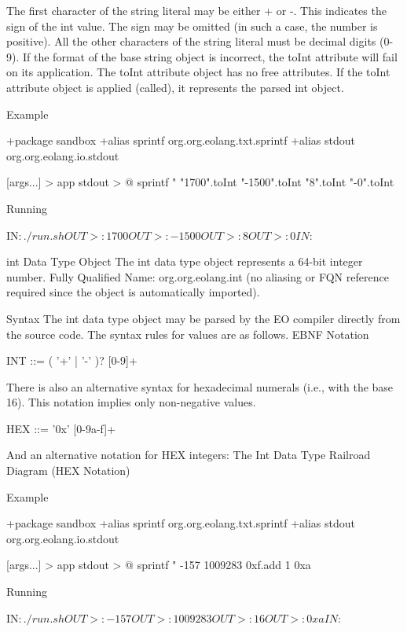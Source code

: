 \documentclass[12pt]{book}
\begin{document}
The first character of the string literal may be either + or -. This indicates the sign of the int value. The sign may be omitted (in such a case, the number is positive).
All the other characters of the string literal must be decimal digits (0-9).
If the format of the base string object is incorrect, the toInt attribute will fail on its application.
The toInt attribute object has no free attributes.
If the toInt attribute object is applied (called), it represents the parsed int object.

Example

\begin{ffcode}
+package sandbox
+alias sprintf org.org.eolang.txt.sprintf
+alias stdout org.org.eolang.io.stdout

[args...] > app
  stdout > @
    sprintf
      "%
      "1700".toInt
      "-1500".toInt
      "8".toInt
      "-0".toInt

Running

IN$: ./run.sh
OUT>: 1700
OUT>: -1500
OUT>: 8
OUT>: 0
IN$: 
\end{ffcode}
int Data Type Object
The int data type object represents a 64-bit integer number.
Fully Qualified Name: org.org.eolang.int (no aliasing or FQN reference required since the object is automatically imported).

Syntax
The int data type object may be parsed by the EO compiler directly from the source code. The syntax rules for values are as follows.
EBNF Notation

\begin{ffcode}
INT      ::= ( '+' | '-' )? [0-9]+
\end{ffcode}
There is also an alternative syntax for hexadecimal numerals (i.e., with the base 16). This notation implies only non-negative values.

\begin{ffcode}
HEX      ::= '0x' [0-9a-f]+
\end{ffcode}


And an alternative notation for HEX integers:
The Int Data Type Railroad Diagram (HEX Notation)

Example
\begin{ffcode}
+package sandbox
+alias sprintf org.org.eolang.txt.sprintf
+alias stdout org.org.eolang.io.stdout

[args...] > app
  stdout > @
    sprintf
      "%
      -157
      1009283
      0xf.add 1
      0xa

Running

IN$: ./run.sh
OUT>: -157
OUT>: 1009283
OUT>: 16
OUT>: 0xa
IN$: 
\end{ffcode}
\end{document}
